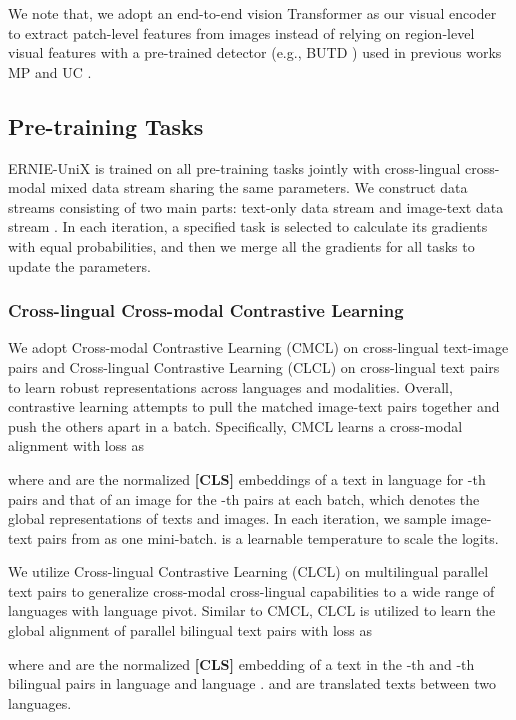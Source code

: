 \documentclass{article}
\begin{document}
We note that, we adopt an end-to-end vision Transformer as our visual encoder to extract patch-level features from images instead of relying on region-level visual features with a pre-trained detector (e.g., BUTD \cite{anderson2018bottom}) used in previous works MP \cite{m3p2020} and UC \cite{UC22021}. 
\subsection{Pre-training Tasks}
\label{Objectives}
ERNIE-UniX is trained on all pre-training tasks jointly with cross-lingual cross-modal mixed data stream sharing the same parameters. We construct data streams  consisting of two main parts: text-only data stream  and image-text data stream . In each iteration, a specified task is selected to calculate its gradients with equal probabilities, and then we merge all the gradients for all tasks to update the parameters.  
\subsubsection{Cross-lingual Cross-modal Contrastive Learning}
\label{Understanding}
We adopt Cross-modal Contrastive Learning (CMCL) on cross-lingual text-image pairs and Cross-lingual Contrastive Learning (CLCL) on cross-lingual text pairs to learn robust representations across languages and modalities. Overall, contrastive learning attempts to pull the matched image-text pairs together and push the others apart in a batch. Specifically, CMCL learns a cross-modal alignment with loss as

where  and  are the normalized \textbf{[CLS]} embeddings of a text in language  for -th pairs and that of an image for the -th pairs at each batch, which denotes the global representations of texts and images. In each iteration, we sample  image-text pairs  from  as one mini-batch.  is a learnable temperature to scale the logits. 

We utilize Cross-lingual Contrastive Learning (CLCL)  on multilingual parallel text pairs to generalize cross-modal cross-lingual capabilities to a wide range of languages with language pivot. Similar to CMCL, CLCL is utilized to learn the global alignment of parallel bilingual text pairs with loss as

where  and  are the normalized \textbf{[CLS]} embedding of a text in the -th and -th bilingual pairs in language  and language .  and  are translated texts between two languages. 
\end{document}
